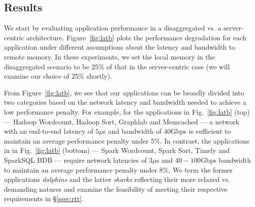 \subsection{Results}
\label{ssec:rr}
We start by evaluating application performance in a disaggregated vs. a server-centric architecture. 
Figure~\ref{fig:latb} plots the performance degradation for each application under different assumptions about the latency and bandwidth to remote memory. In these experiments, we set the local memory in the disaggregated scenario to be  $25\%$ of that in the server-centric case (we will examine our choice of 25\% shortly). 


From Figure~\ref{fig:latb}, we see that our applications can be broadly divided into two categories based on the network latency and bandwidth needed to achieve a low performance penalty.
For example, for the applications in Fig.~\ref{fig:latb} (top) --- Hadoop Wordcount, Hadoop Sort, Graphlab and Memcached --- a network with an end-to-end latency of $5\mu$s and bandwidth of $40$Gbps is sufficient to maintain an average performance penalty under 5\%. 
In contrast, the applications in in Fig.~\ref{fig:latb} (bottom) --- Spark Wordcount, Spark Sort, Timely and SparkSQL BDB --- require network latencies of $3\mu$s and $40-100$Gbps bandwidth to maintain an average performance penalty under 8\%. We term the former applications {\em dolphins} and the latter {\em sharks} reflecting their more relaxed vs. demanding natures and examine the feasibility of meeting their respective requirements in \S\ref{ssec:rtt}.



